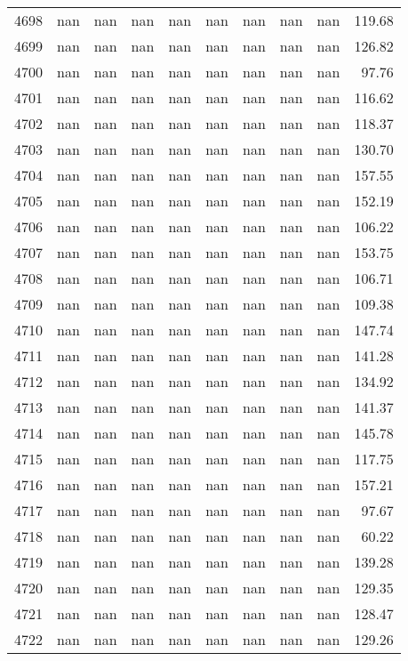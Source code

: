 \begin{tabular}{lrrrrrrrrr}
4698 & nan & nan & nan & nan & nan & nan & nan & nan & 119.68 \\
4699 & nan & nan & nan & nan & nan & nan & nan & nan & 126.82 \\
4700 & nan & nan & nan & nan & nan & nan & nan & nan & 97.76 \\
4701 & nan & nan & nan & nan & nan & nan & nan & nan & 116.62 \\
4702 & nan & nan & nan & nan & nan & nan & nan & nan & 118.37 \\
4703 & nan & nan & nan & nan & nan & nan & nan & nan & 130.70 \\
4704 & nan & nan & nan & nan & nan & nan & nan & nan & 157.55 \\
4705 & nan & nan & nan & nan & nan & nan & nan & nan & 152.19 \\
4706 & nan & nan & nan & nan & nan & nan & nan & nan & 106.22 \\
4707 & nan & nan & nan & nan & nan & nan & nan & nan & 153.75 \\
4708 & nan & nan & nan & nan & nan & nan & nan & nan & 106.71 \\
4709 & nan & nan & nan & nan & nan & nan & nan & nan & 109.38 \\
4710 & nan & nan & nan & nan & nan & nan & nan & nan & 147.74 \\
4711 & nan & nan & nan & nan & nan & nan & nan & nan & 141.28 \\
4712 & nan & nan & nan & nan & nan & nan & nan & nan & 134.92 \\
4713 & nan & nan & nan & nan & nan & nan & nan & nan & 141.37 \\
4714 & nan & nan & nan & nan & nan & nan & nan & nan & 145.78 \\
4715 & nan & nan & nan & nan & nan & nan & nan & nan & 117.75 \\
4716 & nan & nan & nan & nan & nan & nan & nan & nan & 157.21 \\
4717 & nan & nan & nan & nan & nan & nan & nan & nan & 97.67 \\
4718 & nan & nan & nan & nan & nan & nan & nan & nan & 60.22 \\
4719 & nan & nan & nan & nan & nan & nan & nan & nan & 139.28 \\
4720 & nan & nan & nan & nan & nan & nan & nan & nan & 129.35 \\
4721 & nan & nan & nan & nan & nan & nan & nan & nan & 128.47 \\
4722 & nan & nan & nan & nan & nan & nan & nan & nan & 129.26 \\

\end{tabular}
